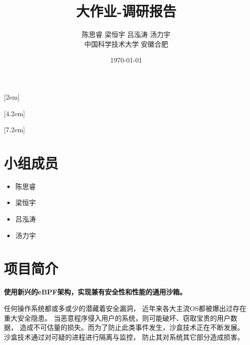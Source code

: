 \documentclass[AutoFakeBold,a4paper]{ctexart}
\begin{document}
\title{\textbf{\Huge 大作业-调研报告}}

\author{陈思睿 \quad 梁恒宇 \quad 吕泓涛 \quad 汤力宇\\
中国科学技术大学 \quad 安徽合肥}

\date{\today}

\maketitle


[2em]{\addvspace{1.3mm}\bf}{%
\contentslabel{2.0em}}{}{\titlerule*[5pt]{$\cdot$}\contentspage}

[4.2em]{}{\contentslabel{2.5em}}{}{%
\titlerule*[5pt]{$\cdot$}\contentspage}

[7.2em]{}{\contentslabel{3.3em}}{}{%
\titlerule*[5pt]{$\cdot$}\contentspage}


    

\tableofcontents

\setcounter{page}{1}

\section{小组成员}

\begin{itemize}
    \item 陈思睿
    \item 梁恒宇
    \item 吕泓涛
    \item 汤力宇
\end{itemize}

\section{项目简介}

\textbf{使用新兴的eBPF架构，实现兼有安全性和性能的通用沙箱。}

任何操作系统都或多或少的潜藏着安全漏洞，
近年来各大主流OS都被爆出过存在重大安全隐患。
当恶意程序侵入用户的系统，则可能破坏、窃取宝贵的用户数据，
造成不可估量的损失。而为了防止此类事件发生，沙盒技术正在不断发展。
沙盒技术通过对可疑的进程进行隔离与监控，
防止其对系统其它部分造成损害。
\end{document}
